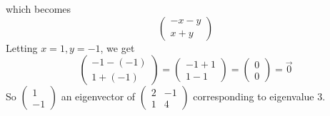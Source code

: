 \documentclass[12pt]{article}
\newenvironment{problem}[2][Problem]
{
	\begin{trivlist} 
		\item[\hskip \labelsep {\bfseries #1 #2:}]
	}
{
	\end{trivlist}
	}
\newenvironment{solution}[1][Solution]
{
	\begin{trivlist} 
		\item[\hskip \labelsep {\itshape #1:}]
	}
	{
	\end{trivlist}
}
\begin{document}
\begin{problem}{3}
\begin{solution}
\[\]
which becomes
\[
\begin{pmatrix}-x-y\\x+y\end{pmatrix} %
\]
Letting $x=1,y=-1$, we get
\[
\begin{pmatrix} -1-(-1)\\1+(-1)\end{pmatrix} = \begin{pmatrix} -1+1\\1-1\end{pmatrix} =\begin{pmatrix}0\\0\end{pmatrix} = \vec{0}
\]
So $\begin{pmatrix}1\\-1\end{pmatrix}$ an eigenvector of $\begin{pmatrix}2&-1\\1&4\end{pmatrix}$ corresponding to eigenvalue $3$.

\end{solution}
\end{problem}
\end{document}
